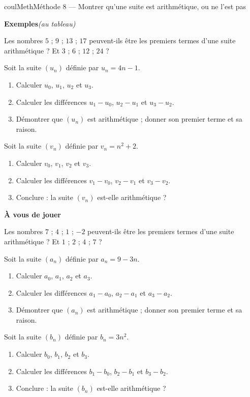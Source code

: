 \documentclass[11pt,a4paper]{article}
\makeatletter
\newcounter{lycee@signet}
\newcommand{\signet}[3][]{\stepcounter{lycee@signet}%
  \edef\lycee@dest{\if\relax\detokenize{#1}\relax
    signet.\arabic{lycee@signet}\else#1\fi}%
  \hypertarget{\lycee@dest}{}\bookmark[level=#2,dest=\lycee@dest]{#3}}
\newcounter{methode}
\newenvironment{methodebox}[1][Méthode]{\stepcounter{methode}%
  \begin{boitecours}[phantom={\signet[methode-\arabic{methode}]{2}{#1}}]{coulMeth}{#1}}%
  {\end{boitecours}}
\newcommand{\etape}[1]{\par\smallskip\textbf{\color{coulMeth}#1}\par\nobreak\smallskip}
\newcommand{\autableau}{\hfill{\footnotesize\itshape\color{black!45}(au tableau)}}
\newcommand{\etapeexemples}{%
    \par\smallskip\textbf{\color{coulMeth}Exemples}\autableau\par\nobreak\smallskip}
\makeatother
\begin{document}
\begin{methodebox}[Méthode 8 --- Montrer qu'une suite est arithmétique, ou ne l'est pas]
\etapeexemples
\begin{questions}[label=\alph*)]
  \item Les nombres $5$ ; $9$ ; $13$ ; $17$ peuvent-ils être les premiers termes d'une
        suite arithmétique ? Et $3$ ; $6$ ; $12$ ; $24$ ?
  \item Soit la suite $(u_{n})$ définie par $u_{n}=4n-1$.
        \begin{enumerate}[label=\arabic*)]
          \item Calculer $u_{0}$, $u_{1}$, $u_{2}$ et $u_{3}$.
          \item Calculer les différences $u_{1}-u_{0}$, $u_{2}-u_{1}$ et $u_{3}-u_{2}$.
          \item Démontrer que $(u_{n})$ est arithmétique ; donner son premier terme et sa
                raison.
        \end{enumerate}
  \item Soit la suite $(v_{n})$ définie par $v_{n}=n^{2}+2$.
        \begin{enumerate}[label=\arabic*)]
          \item Calculer $v_{0}$, $v_{1}$, $v_{2}$ et $v_{3}$.
          \item Calculer les différences $v_{1}-v_{0}$, $v_{2}-v_{1}$ et $v_{3}-v_{2}$.
          \item Conclure : la suite $(v_{n})$ est-elle arithmétique ?
        \end{enumerate}
\end{questions}

\etape{À vous de jouer}
\begin{questions}[label=\alph*)]
  \item Les nombres $7$ ; $4$ ; $1$ ; $-2$ peuvent-ils être les premiers termes d'une
        suite arithmétique ? Et $1$ ; $2$ ; $4$ ; $7$ ?
  \item Soit la suite $(a_{n})$ définie par $a_{n}=9-3n$.
        \begin{enumerate}[label=\arabic*)]
          \item Calculer $a_{0}$, $a_{1}$, $a_{2}$ et $a_{3}$.
          \item Calculer les différences $a_{1}-a_{0}$, $a_{2}-a_{1}$ et $a_{3}-a_{2}$.
          \item Démontrer que $(a_{n})$ est arithmétique ; donner son premier terme et sa
                raison.
        \end{enumerate}
  \item Soit la suite $(b_{n})$ définie par $b_{n}=3n^{2}$.
        \begin{enumerate}[label=\arabic*)]
          \item Calculer $b_{0}$, $b_{1}$, $b_{2}$ et $b_{3}$.
          \item Calculer les différences $b_{1}-b_{0}$, $b_{2}-b_{1}$ et $b_{3}-b_{2}$.
          \item Conclure : la suite $(b_{n})$ est-elle arithmétique ?
        \end{enumerate}
\end{questions}


\end{methodebox}
\end{document}

